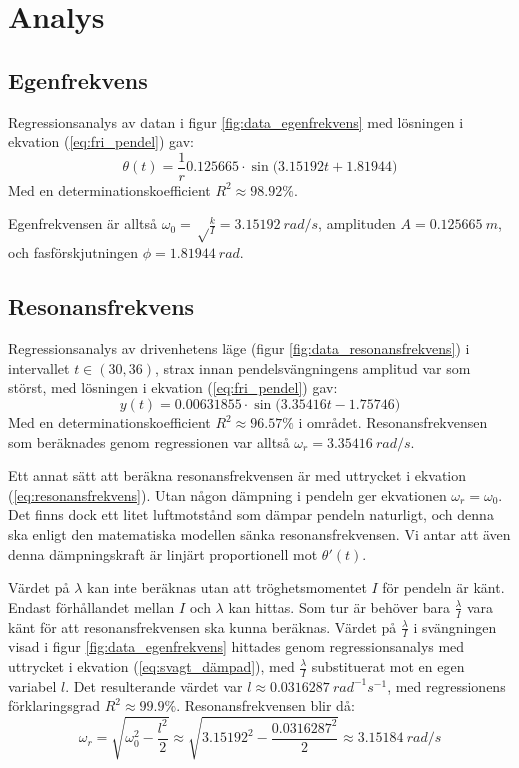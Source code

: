 \documentclass[12pt, a4paper]{article}
\begin{document}
\clearpage
\section{Analys}
\subsection{Egenfrekvens}
Regressionsanalys av datan i figur \ref{fig:data_egenfrekvens} med lösningen i ekvation (\ref{eq:fri_pendel}) gav:
\begin{equation}
	\theta(t)=\frac{1}{r}0.125665\cdot\sin\bigl(3.15192t+1.81944\bigr)
\end{equation}
Med en determinationskoefficient $R^2\approx 98.92\%$.

Egenfrekvensen är alltså $\omega_0=\sqrt\frac{k}{I}=\SI{3.15192}{rad/s}$, amplituden $A=\SI{0.125665}{m}$, och fas\-förskjutningen $\phi=\SI{1.81944}{rad}$.

\subsection{Resonansfrekvens}
Regressionsanalys av drivenhetens läge (figur \ref{fig:data_resonansfrekvens}) i intervallet $t\in(30,36)$, strax innan pendelsvängningens amplitud var som störst, med lösningen i ekvation (\ref{eq:fri_pendel}) gav:
\begin{equation}
	y(t)=0.00631855\cdot\sin\bigl(3.35416t-1.75746\bigr)
\end{equation}
Med en determinationskoefficient $R^2\approx 96.57\%$ i området. Resonansfrekvensen som beräknades genom regressionen var alltså $\omega_r=\SI{3.35416}{rad/s}$. 

Ett annat sätt att beräkna resonansfrekvensen är med uttrycket i ekvation (\ref{eq:resonansfrekvens}). Utan någon dämpning i pendeln ger ekvationen $\omega_r=\omega_0$. Det finns dock ett litet luftmotstånd som dämpar pendeln naturligt, och denna ska enligt den matematiska modellen sänka resonansfrekvensen. Vi antar att även denna dämpningskraft är linjärt proportionell mot $\theta'(t)$.

Värdet på $\lambda$ kan inte beräknas utan att tröghetsmomentet $I$ för pendeln är känt. Endast förhållandet mellan $I$ och $\lambda$ kan hittas. Som tur är behöver bara $\frac{\lambda}{I}$ vara känt för att resonansfrekvensen ska kunna beräknas. Värdet på $\frac{\lambda}{I}$ i svängningen visad i figur \ref{fig:data_egenfrekvens} hittades genom regressionsanalys med uttrycket i ekvation (\ref{eq:svagt_dämpad}), med $\frac{\lambda}{I}$ substituerat mot en egen variabel $l$. Det resulterande värdet var $l\approx\SI{0.0316287}{rad^{-1}s^{-1}}$, med regressionens förklaringsgrad $R^2\approx 99.9\%$. Resonansfrekvensen blir då:
\begin{equation*}
	\omega_r=\sqrt{\omega_0^2-\frac{l^2}{2}}\approx\sqrt{3.15192^2-\frac{0.0316287^2}{2}}\approx\SI{3.15184}{rad/s}
\end{equation*}
\end{document}
